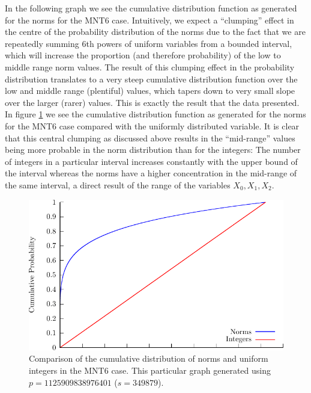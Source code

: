 \documentclass[a4paper, 10pt, envcountsect, runningheads]{lms}
\numberwithin{figure}{section}
\numberwithin{equation}{section}
\begin{document}
In the following graph we see the cumulative distribution function as generated for the norms for the MNT6 case. Intuitively, we expect a ``clumping'' effect in the centre of the probability distribution of the norms due to the fact that we are repeatedly summing 6th powers of uniform variables from a bounded interval, which will increase the proportion (and therefore probability) of the low to middle range norm values. The result of this clumping effect in the probability distribution translates to a very steep cumulative distribution function over the low and middle range (plentiful) values, which tapers down to very small slope over the larger (rarer) values. This is exactly the result that the data presented. In figure \ref{fig:comp} we see the cumulative distribution function as generated for the norms for the MNT6 case compared with the uniformly distributed variable.
It is clear that this central clumping as discussed above results in the ``mid-range'' values being more probable in the norm distribution than for the integers: The number of integers in a particular interval increases constantly with the upper bound of the interval whereas the norms have a higher concentration in the mid-range of the same interval, a direct result of the range of the variables $X_0,X_1,X_2$. 
\begin{center}
\begin{figure}\label{fig:comp}
\includegraphics[scale=1]{graphs/cumulative}\caption{Comparison of the cumulative distribution of norms and uniform integers in the MNT6 case. This particular graph generated using $p=1125909838976401$ ($s=349879$).}
\end{figure}
\end{center}
\end{document}
